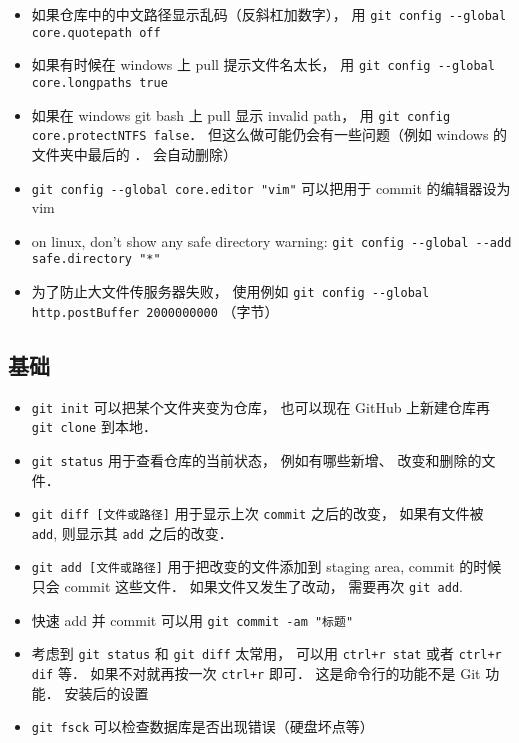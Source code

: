 \begin{itemize}
\item 如果仓库中的中文路径显示乱码（反斜杠加数字）， 用 \verb|git config --global core.quotepath off|
\item 如果有时候在 windows 上 pull 提示文件名太长， 用 \verb|git config --global core.longpaths true|
\item 如果在 windows git bash 上 pull 显示 invalid path， 用 \verb|git config core.protectNTFS false|． 但这么做可能仍会有一些问题（例如 windows 的文件夹中最后的 ． 会自动删除）
\item \verb|git config --global core.editor "vim"| 可以把用于 commit 的编辑器设为 vim
\item on linux, don't show any safe directory warning: \verb|git config --global --add safe.directory "*"|
\item 为了防止大文件传服务器失败， 使用例如 \verb|git config --global http.postBuffer 2000000000| （字节）
\end{itemize}

\subsection{基础}
\begin{itemize}
\item \verb|git init| 可以把某个文件夹变为仓库， 也可以现在 GitHub 上新建仓库再 \verb|git clone| 到本地．
\item \verb|git status| 用于查看仓库的当前状态， 例如有哪些新增、 改变和删除的文件．
\item \verb|git diff [文件或路径]| 用于显示上次 \verb|commit| 之后的改变， 如果有文件被 \verb|add|, 则显示其 \verb|add| 之后的改变．
\item \verb|git add [文件或路径]| 用于把改变的文件添加到 staging area, commit 的时候只会 commit 这些文件． 如果文件又发生了改动， 需要再次 \verb|git add|.
\item 快速 add 并 commit 可以用 \verb|git commit -am "标题"|
\item 考虑到 \verb|git status| 和 \verb|git diff| 太常用， 可以用 \verb|ctrl+r stat| 或者 \verb|ctrl+r dif| 等． 如果不对就再按一次 \verb|ctrl+r| 即可． 这是命令行的功能不是 Git 功能．
安装后的设置
\item \verb|git fsck| 可以检查数据库是否出现错误（硬盘坏点等）
\end{itemize}

